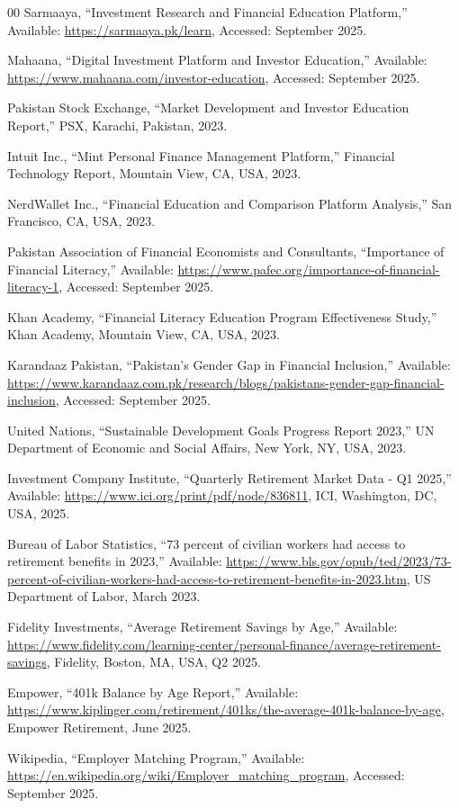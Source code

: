 \documentclass[12pt]{article}
\begin{document}
\begin{thebibliography}{00}
 Sarmaaya, ``Investment Research and Financial Education Platform,'' Available: \url{https://sarmaaya.pk/learn}, Accessed: September 2025.

 Mahaana, ``Digital Investment Platform and Investor Education,'' Available: \url{https://www.mahaana.com/investor-education}, Accessed: September 2025.

 Pakistan Stock Exchange, ``Market Development and Investor Education Report,'' PSX, Karachi, Pakistan, 2023.

 Intuit Inc., ``Mint Personal Finance Management Platform,'' Financial Technology Report, Mountain View, CA, USA, 2023.

 NerdWallet Inc., ``Financial Education and Comparison Platform Analysis,'' San Francisco, CA, USA, 2023.

 Pakistan Association of Financial Economists and Consultants, ``Importance of Financial Literacy,'' Available: \url{https://www.pafec.org/importance-of-financial-literacy-1}, Accessed: September 2025.

 Khan Academy, ``Financial Literacy Education Program Effectiveness Study,'' Khan Academy, Mountain View, CA, USA, 2023.

 Karandaaz Pakistan, ``Pakistan's Gender Gap in Financial Inclusion,'' Available: \url{https://www.karandaaz.com.pk/research/blogs/pakistans-gender-gap-financial-inclusion}, Accessed: September 2025.

 United Nations, ``Sustainable Development Goals Progress Report 2023,'' UN Department of Economic and Social Affairs, New York, NY, USA, 2023.

 Investment Company Institute, ``Quarterly Retirement Market Data - Q1 2025,'' Available: \url{https://www.ici.org/print/pdf/node/836811}, ICI, Washington, DC, USA, 2025.

 Bureau of Labor Statistics, ``73 percent of civilian workers had access to retirement benefits in 2023,'' Available: \url{https://www.bls.gov/opub/ted/2023/73-percent-of-civilian-workers-had-access-to-retirement-benefits-in-2023.htm}, US Department of Labor, March 2023.

 Fidelity Investments, ``Average Retirement Savings by Age,'' Available: \url{https://www.fidelity.com/learning-center/personal-finance/average-retirement-savings}, Fidelity, Boston, MA, USA, Q2 2025.

 Empower, ``401k Balance by Age Report,'' Available: \url{https://www.kiplinger.com/retirement/401ks/the-average-401k-balance-by-age}, Empower Retirement, June 2025.

 Wikipedia, ``Employer Matching Program,'' Available: \url{https://en.wikipedia.org/wiki/Employer_matching_program}, Accessed: September 2025.
\end{thebibliography}
\end{document}
